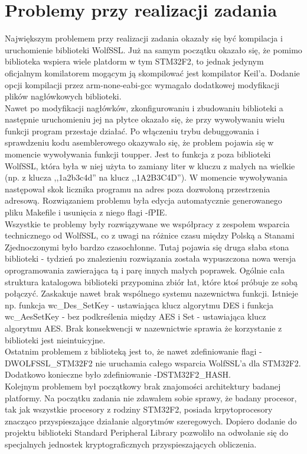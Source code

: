 \documentclass[oneside]{mgr}
\begin{document}
\chapter{Problemy przy realizacji zadania}

Największym problemem przy realizacji zadania okazały się być kompilacja i uruchomienie biblioteki WolfSSL. Już na samym początku okazało się, że pomimo biblioteka wspiera wiele platdorm w tym STM32F2, to jednak jedynym oficjalnym komilatorem mogącym ją skompilować jest kompilator Keil'a. Dodanie opcji kompilacji przez arm-none-eabi-gcc wymagało dodatkowej modyfikacji plików nagłówkowych  biblioteki.\\Nawet po modyfikacji nagłówków, zkonfigurowaniu i zbudowaniu biblioteki a następnie uruchomieniu jej na płytce okazało się, że przy wywoływaniu wielu funkcji program przestaje działać. Po włączeniu trybu debuggowania i sprawdzeniu kodu asemblerowego okazywało się, że problem pojawia się w momencie wywoływania funkcji toupper. Jest to funkcja z poza biblioteki WolfSSL, która była w niej użyta to zamiany liter w kluczu z małych na wielkie (np. z klucza ,,1a2b3c4d'' na klucz ,,1A2B3C4D''). W momencie wywoływania następował skok licznika programu na adres poza dozwoloną przestrzenia adresową. Rozwiązaniem problemu była edycja automatycznie generowanego pliku Makefile i usunięcia z niego flagi -fPIE.\\
Wszystkie te problemy były rozwiązywane we współpracy z zespołem wsparcia technicznego od WolfSSL, co z uwagi na różnice czasu między Polską a Stanami Zjednoczonymi było bardzo czasochłonne. Tutaj pojawia się druga słaba stona biblioteki - tydzień po znalezieniu rozwiązania została wypuszczona nowa wersja oprogramowania zawierająca tą i parę innych małych poprawek. Ogólnie cała struktura katalogowa biblioteki przypomina zbiór łat, które ktoś próbuje ze sobą połączyć. Zaskakuje nawet brak wspólnego systemu nazewnictwa funkcji. Istnieje np. funkcja wc\_Des\_SetKey - ustawiająca klucz algorytmu DES i funkcja wc\_AesSetKey - bez podkreślenia między AES i Set - ustawiająca klucz algorytmu AES. Brak konsekwencji w nazewnictwie sprawia że korzystanie z biblioteki jest nieintuicyjne.\\
Ostatnim problemem z biblioteką jest to, że nawet zdefiniowanie flagi -DWOLFSSL\_STM32F2 nie uruchamia całego wsparcia WolfSSL'a dla STM32F2. Dodatkowo konieczne było zdefiniowanie -DSTM32F2\_HASH.\\
Kolejnym problemem był początkowy brak znajomości architektury badanej platformy. Na początku zadania nie zdawałem sobie sprawy, że badany procesor, tak jak wszystkie procesory z rodziny STM32F2, posiada krpytoprocesory znacząco przyspieszające działanie algorytmów szeregowych. Dopiero dodanie do projektu biblioteki Standard Peripheral Library pozwoliło na odwołanie się do specjalnych jednostek kryptograficznych przyspieszających obliczenia.
\end{document}
